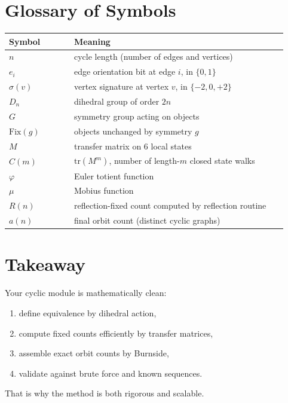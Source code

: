 \documentclass[12pt]{article}
\theoremstyle{definition}
\begin{document}
\section{Glossary of Symbols}
\begin{longtable}{>{\raggedright\arraybackslash}p{0.22\linewidth}p{0.72\linewidth}}
\toprule
Symbol & Meaning \\
\midrule
\(n\) & cycle length (number of edges and vertices) \\
\(e_i\) & edge orientation bit at edge \(i\), in \(\{0,1\}\) \\
\(\sigma(v)\) & vertex signature at vertex \(v\), in \(\{-2,0,+2\}\) \\
\(D_n\) & dihedral group of order \(2n\) \\
\(G\) & symmetry group acting on objects \\
\(\mathrm{Fix}(g)\) & objects unchanged by symmetry \(g\) \\
\(M\) & transfer matrix on 6 local states \\
\(C(m)\) & \(\mathrm{tr}(M^m)\), number of length-\(m\) closed state walks \\
\(\varphi\) & Euler totient function \\
\(\mu\) & Mobius function \\
\(R(n)\) & reflection-fixed count computed by reflection routine \\
\(a(n)\) & final orbit count (distinct cyclic graphs) \\
\bottomrule
\end{longtable}

\section{Takeaway}
Your cyclic module is mathematically clean:
\begin{enumerate}
    \item define equivalence by dihedral action,
    \item compute fixed counts efficiently by transfer matrices,
    \item assemble exact orbit counts by Burnside,
    \item validate against brute force and known sequences.
\end{enumerate}
That is why the method is both rigorous and scalable.
\end{document}
